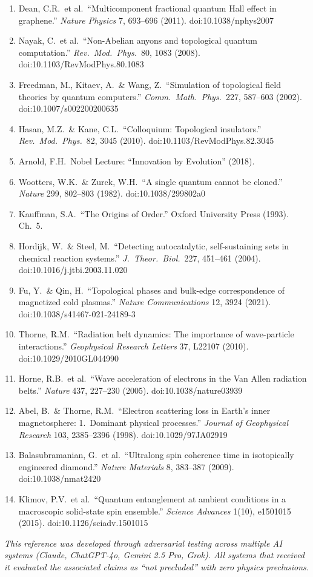 \begin{enumerate}
\item Dean, C.R.\ et al.\ ``Multicomponent fractional quantum Hall effect in graphene.'' \textit{Nature Physics} 7, 693--696 (2011). doi:10.1038/nphys2007
\item Nayak, C.\ et al.\ ``Non-Abelian anyons and topological quantum computation.'' \textit{Rev.\ Mod.\ Phys.}\ 80, 1083 (2008). doi:10.1103/RevModPhys.80.1083
\item Freedman, M., Kitaev, A.\ \& Wang, Z.\ ``Simulation of topological field theories by quantum computers.'' \textit{Comm.\ Math.\ Phys.}\ 227, 587--603 (2002). doi:10.1007/s002200200635
\item Hasan, M.Z.\ \& Kane, C.L.\ ``Colloquium: Topological insulators.'' \textit{Rev.\ Mod.\ Phys.}\ 82, 3045 (2010). doi:10.1103/RevModPhys.82.3045
\item Arnold, F.H.\ Nobel Lecture: ``Innovation by Evolution'' (2018).
\item Wootters, W.K.\ \& Zurek, W.H.\ ``A single quantum cannot be cloned.'' \textit{Nature} 299, 802--803 (1982). doi:10.1038/299802a0
\item Kauffman, S.A.\ ``The Origins of Order.'' Oxford University Press (1993). Ch.~5.
\item Hordijk, W.\ \& Steel, M.\ ``Detecting autocatalytic, self-sustaining sets in chemical reaction systems.'' \textit{J.\ Theor.\ Biol.}\ 227, 451--461 (2004). doi:10.1016/j.jtbi.2003.11.020
\item Fu, Y.\ \& Qin, H.\ ``Topological phases and bulk-edge correspondence of magnetized cold plasmas.'' \textit{Nature Communications} 12, 3924 (2021). doi:10.1038/s41467-021-24189-3
\item Thorne, R.M.\ ``Radiation belt dynamics: The importance of wave-particle interactions.'' \textit{Geophysical Research Letters} 37, L22107 (2010). doi:10.1029/2010GL044990
\item Horne, R.B.\ et al.\ ``Wave acceleration of electrons in the Van Allen radiation belts.'' \textit{Nature} 437, 227--230 (2005). doi:10.1038/nature03939
\item Abel, B.\ \& Thorne, R.M.\ ``Electron scattering loss in Earth's inner magnetosphere: 1.\ Dominant physical processes.'' \textit{Journal of Geophysical Research} 103, 2385--2396 (1998). doi:10.1029/97JA02919
\item Balasubramanian, G.\ et al.\ ``Ultralong spin coherence time in isotopically engineered diamond.'' \textit{Nature Materials} 8, 383--387 (2009). doi:10.1038/nmat2420
\item Klimov, P.V.\ et al.\ ``Quantum entanglement at ambient conditions in a macroscopic solid-state spin ensemble.'' \textit{Science Advances} 1(10), e1501015 (2015). doi:10.1126/sciadv.1501015
\end{enumerate}

\vspace{1em}
\noindent\textit{This reference was developed through adversarial testing across multiple AI systems (Claude, ChatGPT-4o, Gemini 2.5 Pro, Grok). All systems that received it evaluated the associated claims as ``not precluded'' with zero physics preclusions.}
